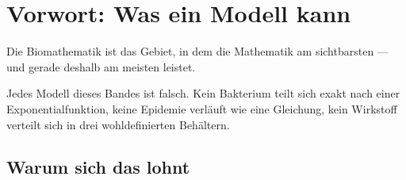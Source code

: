 \chapter*{Vorwort: Was ein Modell kann}

Die Biomathematik ist das Gebiet, in dem die Mathematik am sichtbarsten  --- und gerade deshalb am meisten leistet.

\begin{merksatz}
\begin{center}
\begin{minipage}{0.9\textwidth}
Jedes Modell dieses Bandes ist falsch. Kein Bakterium teilt sich exakt nach einer Exponentialfunktion, keine Epidemie verläuft wie eine Gleichung, kein Wirkstoff verteilt sich in drei wohldefinierten Behältern.
\end{minipage}
\end{center}

\begin{center}
\begin{minipage}{0.88\textwidth}
\end{minipage}
\end{center}
\end{merksatz}

\section*{Warum sich das lohnt}

